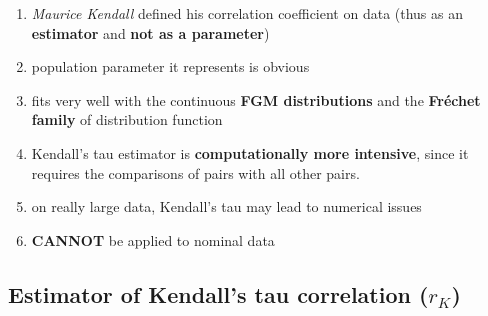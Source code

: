 \begin{enumerate}
    \item \textit{Maurice Kendall} defined his correlation coefficient on data (thus as an \textbf{estimator} and \textbf{not as a parameter})

    \item population parameter it represents is obvious

    \item fits very well with the continuous \textbf{FGM distributions} and the \textbf{Fréchet family} of distribution function
    
    \item Kendall’s tau estimator is \textbf{computationally more intensive}, since it requires the comparisons of pairs with all other pairs. 
    
    \item on really large data, Kendall’s tau may lead to numerical issues

    \item \textbf{CANNOT} be applied to nominal data

\end{enumerate}

\subsection{Estimator of Kendall’s tau correlation ($r_K$) \cite{ism-1}} \label{Multivariate Distributions: Estimator of Kendall’s tau correlation}

